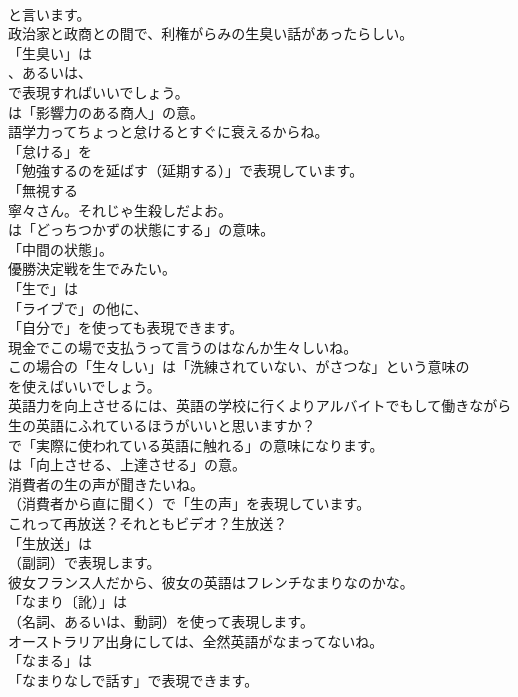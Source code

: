 \documentclass[8pt]{extreport}
\begin{document}
\begin{CJK}{UTF8}{min}
\\	と言います。	
\\	政治家と政商との間で、利権がらみの生臭い話があったらしい。 
\\	「生臭い」は
\\	、あるいは、
\\	で表現すればいいでしょう。
\\	は「影響力のある商人」の意。	
\\	語学力ってちょっと怠けるとすぐに衰えるからね。 
\\	「怠ける」を
\\	「勉強するのを延ばす（延期する）」で表現しています。
\\	「無視する
\\	寧々さん。それじゃ生殺しだよお。 
\\	は「どっちつかずの状態にする」の意味。
\\	「中間の状態」。	
\\	優勝決定戦を生でみたい。 
\\	「生で」は
\\	「ライブで」の他に、
\\	「自分で」を使っても表現できます。	
\\	現金でこの場で支払うって言うのはなんか生々しいね。 
\\	この場合の「生々しい」は「洗練されていない、がさつな」という意味の
\\	を使えばいいでしょう。	
\\	英語力を向上させるには、英語の学校に行くよりアルバイトでもして働きながら生の英語にふれているほうがいいと思いますか？ 
\\	で「実際に使われている英語に触れる」の意味になります。
\\	は「向上させる、上達させる」の意。	
\\	消費者の生の声が聞きたいね。 
\\	（消費者から直に聞く）で「生の声」を表現しています。	
\\	これって再放送？それともビデオ？生放送？ 
\\	「生放送」は 
\\	（副詞）で表現します。	
\\	彼女フランス人だから、彼女の英語はフレンチなまりなのかな。 
\\	「なまり〔訛）」は
\\	（名詞、あるいは、動詞）を使って表現します。	
\\	オーストラリア出身にしては、全然英語がなまってないね。 
\\	「なまる」は
\\	「なまりなしで話す」で表現できます。	

\end{CJK}
\end{document}

